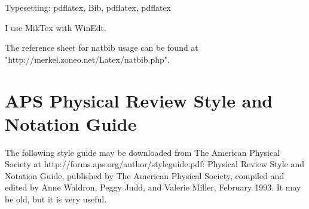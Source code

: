 Typesetting:   pdflatex, Bib, pdflatex, pdflatex

I use MikTex with WinEdt.

The reference sheet for natbib usage can be found at \newline "http://merkel.zoneo.net/Latex/natbib.php".

\section{APS Physical Review Style and Notation Guide}

The following style guide may be downloaded from The American Physical Society at http://forms.aps.org/author/styleguide.pdf:  Physical Review Style and Notation Guide, published by The American Physical Society, compiled and edited by Anne Waldron, Peggy Judd, and Valerie Miller, February 1993.  It may be old, but it is very useful.
